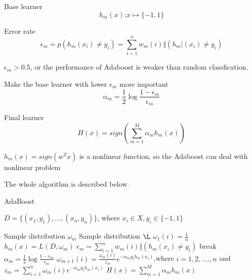 \documentclass[journal, a4paper]{IEEEtran}
\begin{document}
    Base learner
    \begin{equation}
        h_m(x)\text{:}x\mapsto\lbrace-1,1\rbrace
    \end{equation}

    Error rate
    \begin{equation}
        \epsilon_m=p(h_m(x_i)\neq y_i)=\sum_{i=1}^nw_m(i)\Vert(h_m|(x_i)\neq y_i)
    \end{equation}
    
    $\epsilon_m>0.5$, or the performance of Adaboost is weaker than random classfication.

    Make the base learner with lower $\epsilon_m$ more important
    \begin{equation}
        \alpha_m=\frac{1}{2}\log\frac{1-\epsilon_m}{\epsilon_m}
    \end{equation}

    Final learner
    \begin{equation}
        H(x)=sign(\sum_{m=1}^M\alpha_mh_m(x))
    \end{equation}
    
    $h_m(x) = sign(w^Tx)$ is a nonlinear function, so the Adaboost can deal with nonlinear problem

    The whole algorithm is described below.
    \begin{algorithm}[H]
        \caption{AdaBoost}
        \begin{algorithmic}[1]
            \renewcommand{\algorithmicrequire}{\textbf{Input:}}
            \renewcommand{\algorithmicensure}{\textbf{Output:}}
            
            \REQUIRE $D=\lbrace(x_1,y_1),...,(x_n,y_n)\rbrace$, where $x_i\in X,y_i\in\lbrace-1,1\rbrace$

            \renewcommand{\algorithmicrequire}{\textbf{Initizlize:}}
            \REQUIRE Sample distribution $\omega_m$
            \renewcommand{\algorithmicrequire}{\textbf{Base learner:}}
            \REQUIRE Sample distribution $\L$
            \STATE $\omega_1(i)=\frac{1}n$
            \STATE $h_m(x)=L(D,\omega_m)$
            \STATE $\epsilon_m=\sum_{i=1}^nw_m(i)\Vert(h_m(x_i)\neq y_i)$
            \STATE break
            \ENDIF
            \STATE $\alpha_m=\frac{1}{2}\log\frac{1-\epsilon_m}{\epsilon_m}$
            \STATE $\omega_{m+1}(i)=\frac{\omega_m(i)}{z_m}e^{-\alpha_my_ih_m(x_i)}$,where $i =1,2,....,n$ and $z_m=\sum_{i=1}^{n}\omega_m(i)e^{-\alpha_my_ih_m(x_i)}$
            \ENDFOR
            \ENSURE  $H(x)=\sum_{m=1}^M\alpha_mh_m(x)$
        \end{algorithmic} 
    \end{algorithm}
\end{document}
